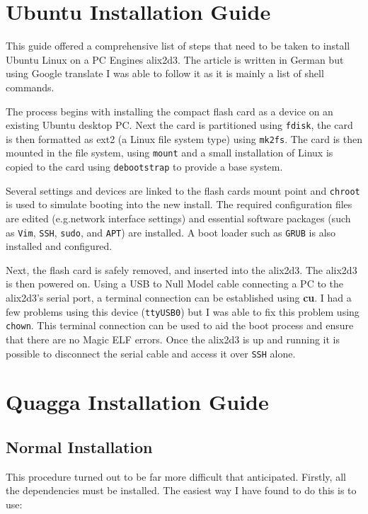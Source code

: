 \section*{Ubuntu Installation Guide}

 This guide\cite{germanGuide} offered a comprehensive list of steps that need to
 be taken to install Ubuntu Linux on a PC Engines alix2d3\cite{alix2d3}.  The article is
 written in German but using Google translate I was able to follow it as it is
 mainly a list of shell commands.

 The process begins with installing the compact flash card as a device on an
 existing Ubuntu desktop PC\@. Next the card is partitioned using \texttt{fdisk},
 the card is then formatted as ext2 (a Linux file system type) using
 \texttt{mk2fs}. The card is then mounted in the file system, using
 \texttt{mount} and a small installation of Linux is copied to the card using
 \texttt{debootstrap} to provide a base system.

 Several settings and devices are linked to the flash cards mount point and
 \texttt{chroot} is used to simulate booting into the new install. The required
 configuration files are edited (e.g.\@ network interface settings) and essential
 software packages (such as \texttt{Vim}, \texttt{SSH}, \texttt{sudo}, and
 \texttt{APT}) are installed. A boot loader such as \texttt{GRUB} is also
 installed and configured.

 Next, the flash card is safely removed, and  inserted into the alix2d3. The
 alix2d3 is then powered on. Using a USB to Null Model cable connecting a PC to
 the alix2d3's serial port, a terminal connection can be established using {\bf
 cu}. I had a few problems using this device (\texttt{ttyUSB0}) but I was able to
 fix this problem using \texttt{chown}. This terminal connection can be used to
 aid the boot process and ensure that there are no Magic ELF errors. Once the
 alix2d3 is up and running it is possible to disconnect the serial cable and
 access it over \texttt{SSH} alone.

 \section*{Quagga Installation Guide}

 \subsection*{Normal Installation}
This procedure turned out to be far more difficult that anticipated. Firstly,
all the dependencies must be installed. The easiest way I have found to do this
is to use:


